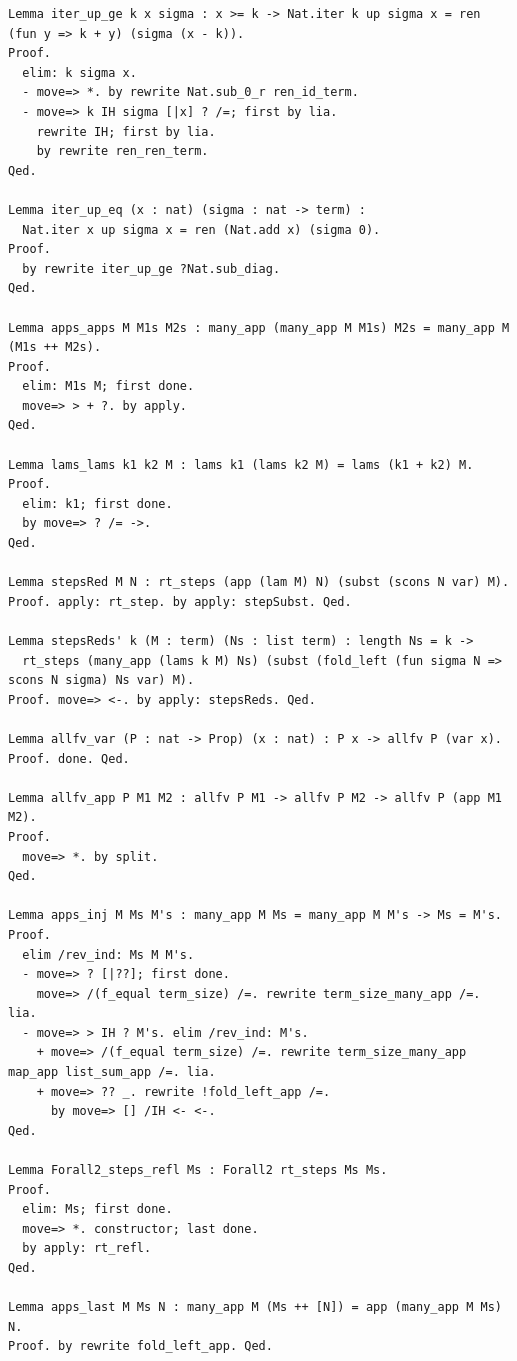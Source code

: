 \documentclass[10pt,a4paper]{amsart}
\begin{document}
\begin{lstlisting}
Lemma iter_up_ge k x sigma : x >= k -> Nat.iter k up sigma x = ren (fun y => k + y) (sigma (x - k)).
Proof.
  elim: k sigma x.
  - move=> *. by rewrite Nat.sub_0_r ren_id_term. 
  - move=> k IH sigma [|x] ? /=; first by lia.
    rewrite IH; first by lia.
    by rewrite ren_ren_term.
Qed.

Lemma iter_up_eq (x : nat) (sigma : nat -> term) :
  Nat.iter x up sigma x = ren (Nat.add x) (sigma 0).
Proof.
  by rewrite iter_up_ge ?Nat.sub_diag.
Qed.

Lemma apps_apps M M1s M2s : many_app (many_app M M1s) M2s = many_app M (M1s ++ M2s).
Proof.
  elim: M1s M; first done.
  move=> > + ?. by apply.
Qed.

Lemma lams_lams k1 k2 M : lams k1 (lams k2 M) = lams (k1 + k2) M.
Proof.
  elim: k1; first done.
  by move=> ? /= ->.
Qed.

Lemma stepsRed M N : rt_steps (app (lam M) N) (subst (scons N var) M).
Proof. apply: rt_step. by apply: stepSubst. Qed.

Lemma stepsReds' k (M : term) (Ns : list term) : length Ns = k ->
  rt_steps (many_app (lams k M) Ns) (subst (fold_left (fun sigma N => scons N sigma) Ns var) M).
Proof. move=> <-. by apply: stepsReds. Qed.

Lemma allfv_var (P : nat -> Prop) (x : nat) : P x -> allfv P (var x).
Proof. done. Qed.

Lemma allfv_app P M1 M2 : allfv P M1 -> allfv P M2 -> allfv P (app M1 M2).
Proof.
  move=> *. by split.
Qed.

Lemma apps_inj M Ms M's : many_app M Ms = many_app M M's -> Ms = M's.
Proof.
  elim /rev_ind: Ms M M's.
  - move=> ? [|??]; first done.
    move=> /(f_equal term_size) /=. rewrite term_size_many_app /=. lia.
  - move=> > IH ? M's. elim /rev_ind: M's.
    + move=> /(f_equal term_size) /=. rewrite term_size_many_app map_app list_sum_app /=. lia.
    + move=> ?? _. rewrite !fold_left_app /=.
      by move=> [] /IH <- <-.
Qed.

Lemma Forall2_steps_refl Ms : Forall2 rt_steps Ms Ms.
Proof.
  elim: Ms; first done.
  move=> *. constructor; last done.
  by apply: rt_refl.
Qed.

Lemma apps_last M Ms N : many_app M (Ms ++ [N]) = app (many_app M Ms) N.
Proof. by rewrite fold_left_app. Qed.


\end{lstlisting}
\end{document}
